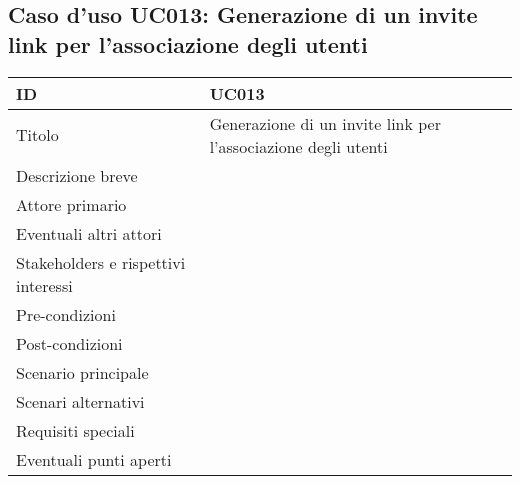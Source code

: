 \documentclass[../../main.tex]{subfiles}
\begin{document}
\subsection{Caso d’uso UC013: Generazione di un invite link per l'associazione degli utenti }
\begin{tabularx}{150mm}{|l|X|}
    \hline
    ID                                  & \textbf{UC013}\\
    \hline
    Titolo                              & Generazione di un invite link per l'associazione degli utenti \\
    \hline
    Descrizione breve                   &    \\
    \hline
    Attore primario                     &    \\
    \hline
    Eventuali altri attori              &    \\
    \hline
    Stakeholders e rispettivi interessi &    \\
    \hline
    Pre-condizioni                      &    \\
    \hline
    Post-condizioni                     &    \\
    \hline
    Scenario principale                 &    \\
    \hline
    Scenari alternativi                 &    \\
    \hline
    Requisiti speciali                  &    \\
    \hline
    Eventuali punti aperti              &    \\
    \hline
\end{tabularx}
\newpage
\end{document}
